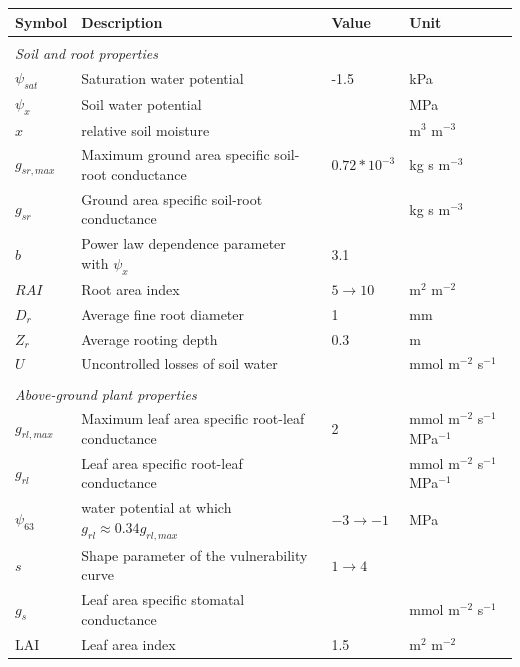\documentclass[utf8]{frontiersSCNS} %
\begin{document}
\begin{table}[h]
    \centering
    \begin{tabular}{l l l l}
        Symbol & Description & Value & Unit \\
        \hline
        \multicolumn{4}{l}{}\\
        \multicolumn{4}{l}{\textit{Soil and root properties}}\\
        \hline
        $\psi_{sat}$ & Saturation water potential & -1.5 & kPa\\
        $\psi_x$ & Soil water potential & & MPa\\
        $x$ & relative soil moisture & & m$^{3}$ m$^{-3}$\\
        $g_{sr,max}$ & Maximum ground area specific soil-root conductance & $0.72 * 10^{-3}$ & kg s m$^{-3}$ \\
        $g_{sr}$ & Ground area specific soil-root conductance & & kg s m$^{-3}$\\
        $b$ & Power law dependence parameter with $\psi_x$ & 3.1 & \\
        $RAI$ & Root area index & $5 \rightarrow 10$ & m$^{2}$ m$^{-2}$\\
        $D_r$ & Average fine root diameter & 1 & mm \\
        $Z_r$ & Average rooting depth & 0.3 & m\\ 
        $U$ & Uncontrolled losses of soil water & & mmol m$^{-2}$ s$^{-1}$\\
        \hline
        \multicolumn{4}{l}{}\\
        \multicolumn{4}{l}{\textit{Above-ground plant properties}}\\
        \hline
        $g_{rl,max}$ & Maximum leaf area specific root-leaf conductance & 2 & mmol m$^{-2}$ s$^{-1}$ MPa$^{-1}$ \\
        $g_{rl}$ & Leaf area specific root-leaf conductance & & mmol m$^{-2}$ s$^{-1}$ MPa$^{-1}$ \\
        $\psi_{63}$ & water potential at which $g_{rl} \approx 0.34 g_{rl,max}$ & $-3 \rightarrow -1$ & MPa \\
        $s$ & Shape parameter of the vulnerability curve & $1 \rightarrow 4$ &  \\
        $g_s$ & Leaf area specific stomatal conductance & & mmol m$^{-2}$ s$^{-1}$ \\
        LAI & Leaf area index & 1.5 & m$^{2}$ m$^{-2}$\\

\end{tabular}
\end{table}
\end{document}
